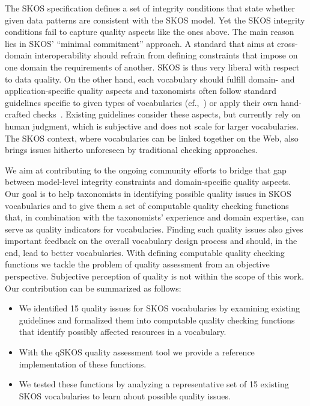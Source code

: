 The SKOS specification defines a set of integrity conditions that state whether given data patterns are consistent with the SKOS model. Yet the SKOS integrity conditions fail to capture quality aspects like the ones above. The main reason lies in SKOS' ``minimal commitment'' approach. A standard that aims at cross-domain interoperability should refrain from defining constraints that impose on one domain the requirements of another. SKOS is thus very liberal with respect to data quality. On the other hand, each vocabulary should fulfill domain- and application-specific quality aspects and taxonomists often follow standard guidelines specific to given types of vocabularies (cf.,~\cite{ISO25964-1:2011,Z39.19:2005}) or apply their own hand-crafted checks~\cite{Coronado2009}. Existing guidelines consider these aspects, but currently rely on human judgment, which is subjective and does not scale for larger vocabularies. The SKOS context, where vocabularies can be linked together on the Web, also brings issues hitherto unforeseen by traditional checking approaches.


We aim at contributing to the ongoing community efforts to bridge that gap between model-level integrity constraints and domain-specific quality aspects. Our goal is to help taxonomists in identifying possible quality issues in SKOS vocabularies and to give them a set of computable quality checking functions that, in combination with the taxonomists' experience and domain expertise, can serve as quality indicators for vocabularies. Finding such quality issues also gives important feedback on the overall vocabulary design process and should, in the end, lead to better vocabularies. With defining computable quality checking functions we tackle the problem of quality assessment from an objective perspective. Subjective perception of quality is not within the scope of this work. Our contribution can be summarized as follows:

\begin{itemize}

	\item We identified 15 quality issues for SKOS vocabularies by examining existing guidelines and formalized them into computable quality checking functions that identify possibly affected resources in a vocabulary.
	
	\item With the qSKOS quality assessment tool we provide a reference implementation of these functions.

	\item We tested these functions by analyzing a representative set of 15 existing SKOS vocabularies to learn about possible quality issues.

\end{itemize}

